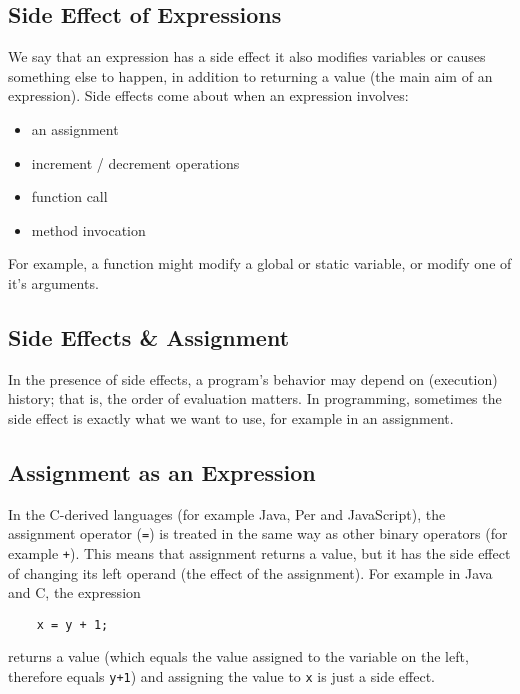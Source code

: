 \subsection{Side Effect of Expressions}
We say that an expression has a side effect it also modifies variables or causes something else to happen, in addition to returning a value (the main aim of an expression). Side effects come about when an expression involves:
\begin{itemize}
    \item an assignment
    \item increment / decrement operations
    \item function call
    \item method invocation
\end{itemize}

For example, a function might modify a global or static variable, or modify one of it's arguments. 

\subsection{Side Effects \& Assignment}
In the presence of side effects, a program's behavior may depend on (execution) history; that is, the order of evaluation matters. In programming, sometimes the side effect is exactly what we want to use, for example in an assignment.

\subsection{Assignment as an Expression}
In the C-derived languages (for example Java, Per and JavaScript), the assignment operator (\verb|=|) is treated in the same way as other binary operators (for example \verb|+|). This means that assignment returns a value, but it has the side effect of changing its left operand (the effect of the assignment). For example in Java and C, the expression
\begin{verbatim}
    x = y + 1;
\end{verbatim}
returns a value (which equals the value assigned to the variable on the left, therefore equals \verb|y+1|) and assigning the value to \verb|x| is just a side effect. 

